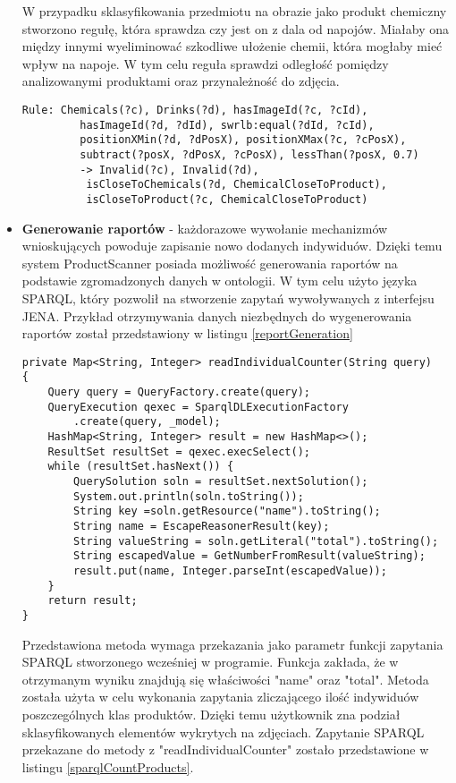 \begin{itemize}
W przypadku sklasyfikowania przedmiotu na obrazie jako produkt chemiczny stworzono regułę, która sprawdza czy jest on z dala od napojów. Miałaby ona między innymi wyeliminować szkodliwe ułożenie chemii, która mogłaby mieć wpływ na napoje. W tym celu reguła sprawdzi odległość pomiędzy analizowanymi produktami oraz przynależność do zdjęcia.

\begin{lstlisting}[caption={Reguła sprawdzająca bliską odległość środka chemicznego od napoju.}]
Rule: Chemicals(?c), Drinks(?d), hasImageId(?c, ?cId), 
		 hasImageId(?d, ?dId), swrlb:equal(?dId, ?cId), 
		 positionXMin(?d, ?dPosX), positionXMax(?c, ?cPosX),
		 subtract(?posX, ?dPosX, ?cPosX), lessThan(?posX, 0.7) 
		 -> Invalid(?c), Invalid(?d),
		  isCloseToChemicals(?d, ChemicalCloseToProduct), 
		  isCloseToProduct(?c, ChemicalCloseToProduct)
\end{lstlisting}
\item \textbf{Generowanie raportów} - każdorazowe wywołanie mechanizmów wnioskujących powoduje zapisanie nowo dodanych indywiduów. Dzięki temu system ProductScanner posiada możliwość generowania raportów na podstawie zgromadzonych danych w ontologii. W tym celu użyto języka SPARQL, który pozwolił na stworzenie zapytań wywoływanych z interfejsu JENA. Przykład otrzymywania danych niezbędnych do wygenerowania raportów został przedstawiony w listingu \ref{reportGeneration}

\begin{lstlisting}[caption={Wykonywania zapytania SPARQL na istniejącej bazie wiedzy.}, label={reportGeneration}]
private Map<String, Integer> readIndividualCounter(String query)
{
	Query query = QueryFactory.create(query);
	QueryExecution qexec = SparqlDLExecutionFactory
		.create(query, _model);
	HashMap<String, Integer> result = new HashMap<>();
	ResultSet resultSet = qexec.execSelect();
	while (resultSet.hasNext()) {
		QuerySolution soln = resultSet.nextSolution();
		System.out.println(soln.toString());
		String key =soln.getResource("name").toString();
		String name = EscapeReasonerResult(key);
		String valueString = soln.getLiteral("total").toString();
		String escapedValue = GetNumberFromResult(valueString);
		result.put(name, Integer.parseInt(escapedValue));
	}
	return result;
}
\end{lstlisting}

Przedstawiona metoda wymaga przekazania jako parametr funkcji zapytania SPARQL stworzonego wcześniej w programie. Funkcja zakłada, że w otrzymanym wyniku znajdują się właściwości "name" oraz "total". Metoda została użyta w celu wykonania zapytania zliczającego ilość indywiduów poszczególnych klas produktów. Dzięki temu użytkownik zna podział sklasyfikowanych elementów wykrytych na zdjęciach. Zapytanie SPARQL przekazane do metody z "readIndividualCounter" zostało przedstawione w listingu \ref{sparqlCountProducts}.


\end{itemize}
